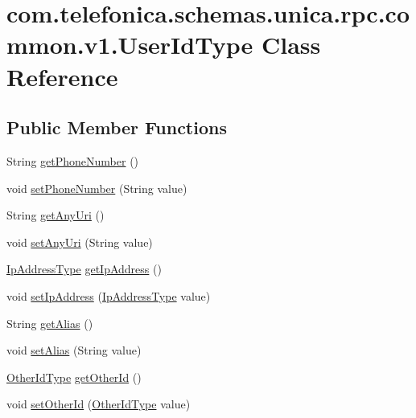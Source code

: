 \hypertarget{classcom_1_1telefonica_1_1schemas_1_1unica_1_1rpc_1_1common_1_1v1_1_1UserIdType}{
\section{com.telefonica.schemas.unica.rpc.common.v1.UserIdType Class Reference}
\label{classcom_1_1telefonica_1_1schemas_1_1unica_1_1rpc_1_1common_1_1v1_1_1UserIdType}
}
\subsection*{Public Member Functions}
\begin{DoxyCompactItemize}
\item 
String \hyperlink{classcom_1_1telefonica_1_1schemas_1_1unica_1_1rpc_1_1common_1_1v1_1_1UserIdType_ae9c146792fdb2fb9ba24666e7bf1ea9d}{getPhoneNumber} ()
\item 
void \hyperlink{classcom_1_1telefonica_1_1schemas_1_1unica_1_1rpc_1_1common_1_1v1_1_1UserIdType_a0007312eb2f771f2f7d62ca997539674}{setPhoneNumber} (String value)
\item 
String \hyperlink{classcom_1_1telefonica_1_1schemas_1_1unica_1_1rpc_1_1common_1_1v1_1_1UserIdType_aadd8a48573f2b847ecc3ffc526f6ddb1}{getAnyUri} ()
\item 
void \hyperlink{classcom_1_1telefonica_1_1schemas_1_1unica_1_1rpc_1_1common_1_1v1_1_1UserIdType_ace49af343b437dcf2aba648543ac51d5}{setAnyUri} (String value)
\item 
\hyperlink{classcom_1_1telefonica_1_1schemas_1_1unica_1_1rpc_1_1common_1_1v1_1_1IpAddressType}{IpAddressType} \hyperlink{classcom_1_1telefonica_1_1schemas_1_1unica_1_1rpc_1_1common_1_1v1_1_1UserIdType_ad74e09a229f61df638f5162a50d85b65}{getIpAddress} ()
\item 
void \hyperlink{classcom_1_1telefonica_1_1schemas_1_1unica_1_1rpc_1_1common_1_1v1_1_1UserIdType_a1942e0be2ce4ef7e576e50b4cbcd5685}{setIpAddress} (\hyperlink{classcom_1_1telefonica_1_1schemas_1_1unica_1_1rpc_1_1common_1_1v1_1_1IpAddressType}{IpAddressType} value)
\item 
String \hyperlink{classcom_1_1telefonica_1_1schemas_1_1unica_1_1rpc_1_1common_1_1v1_1_1UserIdType_a91af9aada100f9a3b41e4ebf68c7a499}{getAlias} ()
\item 
void \hyperlink{classcom_1_1telefonica_1_1schemas_1_1unica_1_1rpc_1_1common_1_1v1_1_1UserIdType_a2cf9234c37f48d195e069d9111f597ea}{setAlias} (String value)
\item 
\hyperlink{classcom_1_1telefonica_1_1schemas_1_1unica_1_1rpc_1_1common_1_1v1_1_1OtherIdType}{OtherIdType} \hyperlink{classcom_1_1telefonica_1_1schemas_1_1unica_1_1rpc_1_1common_1_1v1_1_1UserIdType_a4e66e594c92565c9d90381717837338e}{getOtherId} ()
\item 
void \hyperlink{classcom_1_1telefonica_1_1schemas_1_1unica_1_1rpc_1_1common_1_1v1_1_1UserIdType_adfe74f4cef5482cd8d15856e33a1a25b}{setOtherId} (\hyperlink{classcom_1_1telefonica_1_1schemas_1_1unica_1_1rpc_1_1common_1_1v1_1_1OtherIdType}{OtherIdType} value)
\end{DoxyCompactItemize}
